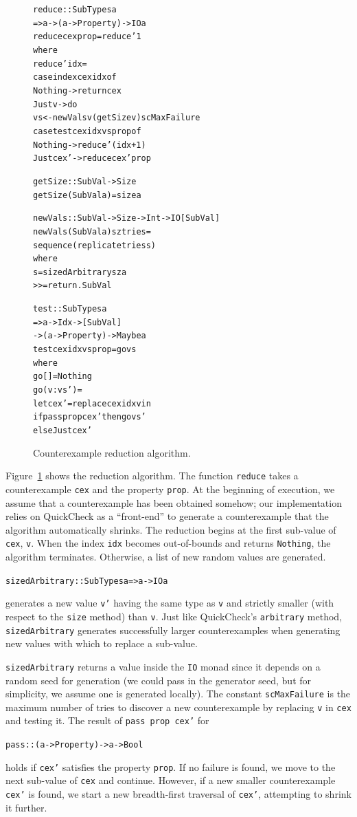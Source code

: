 \documentclass[10pt]{sigplanconf}
\newenvironment{code}{\begin{alltt}}{\end{alltt}}
\newcommand{\ttp}[1]{\texttt{#1}}
\begin{document}
\begin{figure}[ht]
  \begin{code}
reduce :: SubTypes a
       => a -> (a -> Property) -> IO a
reduce cex prop = reduce' 1
  where
  reduce' idx =
    case index cex idx of
      Nothing -> return cex
      Just v  -> do
        vs <- newVals v (getSize v) scMaxFailure
        case test cex idx vs prop of
          Nothing   -> reduce' (idx+1)
          Just cex' -> reduce cex' prop

getSize :: SubVal -> Size
getSize (SubVal a) = size a

newVals :: SubVal -> Size -> Int -> IO [SubVal]
newVals (SubVal a) sz tries =
  sequence (replicate tries s)
  where
  s  =     sizedArbitrary sz a
       >>= return . SubVal

test :: SubTypes a
     => a -> Idx -> [SubVal]
     -> (a -> Property) -> Maybe a
test cex idx vs prop = go vs
  where
  go []      = Nothing
  go (v:vs') =
    let cex' = replace cex idx v in
    if pass prop cex' then go vs'
      else Just cex'
  \end{code}
  \caption{Counterexample reduction algorithm.\label{fig:reduction}}
\end{figure}

Figure~\ref{fig:reduction} shows the reduction algorithm.  The function
\ttp{reduce} takes a counterexample \ttp{cex} and the property \ttp{prop}.  At
the beginning of execution, we assume that a counterexample has been obtained
somehow; our implementation relies on QuickCheck as a ``front-end'' to generate
a counterexample that the algorithm automatically shrinks.  The reduction begins
at the first sub-value of \ttp{cex}, \ttp{v}.  When the index \ttp{idx} becomes
out-of-bounds and returns \ttp{Nothing}, the algorithm terminates.  Otherwise, a
list of new random values are generated.
%
\begin{code}
sizedArbitrary :: SubTypes a => a -> IO a
\end{code}
%
\noindent
generates a new value \ttp{v'} having the same type as \ttp{v} and strictly
smaller (with respect to the \ttp{size} method) than \ttp{v}.  Just like
QuickCheck's \ttp{arbitrary} method, \ttp{sizedArbitrary} generates successfully
larger counterexamples when generating new values with which to replace a
sub-value.

\ttp{sizedArbitrary} returns a value inside the \ttp{IO} monad since it depends
on a random seed for generation (we could pass in the generator seed, but for
simplicity, we assume one is generated locally).  The constant \ttp{scMaxFailure} is
the maximum number of tries to discover a new counterexample by replacing
\ttp{v} in \ttp{cex} and testing it.  The result of \ttp{pass prop cex'} for
%
\begin{code}
pass :: (a -> Property) -> a -> Bool
\end{code}
%
\noindent
holds if \ttp{cex'} satisfies the property \ttp{prop}.  If no failure is found,
we move to the next sub-value of \ttp{cex} and continue.  However, if a new
smaller counterexample \ttp{cex'} is found, we start a new breadth-first
traversal of \ttp{cex'}, attempting to shrink it further.
\end{document}
